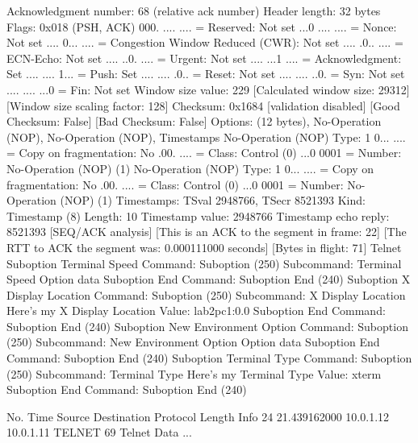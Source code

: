     Acknowledgment number: 68    (relative ack number)
    Header length: 32 bytes
    Flags: 0x018 (PSH, ACK)
        000. .... .... = Reserved: Not set
        ...0 .... .... = Nonce: Not set
        .... 0... .... = Congestion Window Reduced (CWR): Not set
        .... .0.. .... = ECN-Echo: Not set
        .... ..0. .... = Urgent: Not set
        .... ...1 .... = Acknowledgment: Set
        .... .... 1... = Push: Set
        .... .... .0.. = Reset: Not set
        .... .... ..0. = Syn: Not set
        .... .... ...0 = Fin: Not set
    Window size value: 229
    [Calculated window size: 29312]
    [Window size scaling factor: 128]
    Checksum: 0x1684 [validation disabled]
        [Good Checksum: False]
        [Bad Checksum: False]
    Options: (12 bytes), No-Operation (NOP), No-Operation (NOP), Timestamps
        No-Operation (NOP)
            Type: 1
                0... .... = Copy on fragmentation: No
                .00. .... = Class: Control (0)
                ...0 0001 = Number: No-Operation (NOP) (1)
        No-Operation (NOP)
            Type: 1
                0... .... = Copy on fragmentation: No
                .00. .... = Class: Control (0)
                ...0 0001 = Number: No-Operation (NOP) (1)
        Timestamps: TSval 2948766, TSecr 8521393
            Kind: Timestamp (8)
            Length: 10
            Timestamp value: 2948766
            Timestamp echo reply: 8521393
    [SEQ/ACK analysis]
        [This is an ACK to the segment in frame: 22]
        [The RTT to ACK the segment was: 0.000111000 seconds]
        [Bytes in flight: 71]
Telnet
    Suboption Terminal Speed
        Command: Suboption (250)
        Subcommand: Terminal Speed
            Option data
    Suboption End
        Command: Suboption End (240)
    Suboption X Display Location
        Command: Suboption (250)
        Subcommand: X Display Location
            Here's my X Display Location
            Value: lab2pc1:0.0
    Suboption End
        Command: Suboption End (240)
    Suboption New Environment Option
        Command: Suboption (250)
        Subcommand: New Environment Option
            Option data
    Suboption End
        Command: Suboption End (240)
    Suboption Terminal Type
        Command: Suboption (250)
        Subcommand: Terminal Type
            Here's my Terminal Type
            Value: xterm
    Suboption End
        Command: Suboption End (240)

No.     Time           Source                Destination           Protocol Length Info
     24 21.439162000   10.0.1.12             10.0.1.11             TELNET   69     Telnet Data ...


